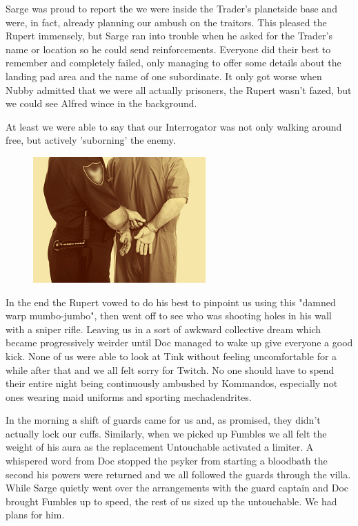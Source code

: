 Sarge was proud to report the we were inside the Trader's planetside base and were, in fact, already planning our ambush on the traitors. 
This pleased the Rupert immensely, but Sarge ran into trouble when he asked for the Trader's name or location so he could send reinforcements. 
Everyone did their best to remember and completely failed, only managing to offer some details about the landing pad area and the name of one subordinate. 
It only got worse when Nubby admitted that we were all actually prisoners, the Rupert wasn't fazed, but we could see Alfred wince in the background.

At least we were able to say that our Interrogator was not only walking around free, but actively 'suborning' the enemy.

\begin{figure}
	\begin{center}
		\includegraphics[width=\figwidth]{pics/9/45.png}
	\end{center}
\end{figure}
In the end the Rupert vowed to do his best to pinpoint us using this "damned warp mumbo-jumbo", then went off to see who was shooting holes in his wall with a sniper rifle. 
Leaving us in a sort of awkward collective dream which became progressively weirder until Doc managed to wake up give everyone a good kick. 
None of us were able to look at Tink without feeling uncomfortable for a while after that and we all felt sorry for Twitch. 
No one should have to spend their entire night being continuously ambushed by Kommandos, especially not ones wearing maid uniforms and sporting mechadendrites.

In the morning a shift of guards came for us and, as promised, they didn't actually lock our cuffs. 
Similarly, when we picked up Fumbles we all felt the weight of his aura as the replacement Untouchable activated a limiter. 
A whispered word from Doc stopped the psyker from starting a bloodbath the second his powers were returned and we all followed the guards through the villa. 
While Sarge quietly went over the arrangements with the guard captain and Doc brought Fumbles up to speed, the rest of us sized up the untouchable. 
We had plans for him.

